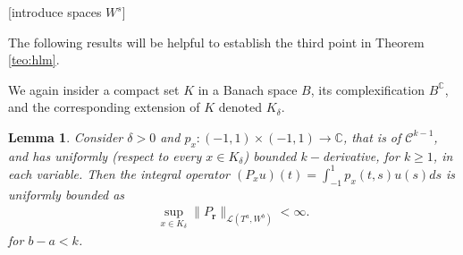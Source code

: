 \documentclass{article}
\newtheorem{lemma}[theorem]{Lemma}
\newcommand{\todo}[1]{{\color{red}[#1]}}
\newcommand{\IC}{{\mathbb C}}
\begin{document}
\todo{introduce spaces $W^s$}

The following results will be helpful to establish the third point in Theorem \ref{teo:hlm}. 

We again insider a compact set $K$ in a Banach space $B$, its complexification $B^\IC$, and the corresponding extension of $K$ denoted $K_\delta$. 

\begin{lemma}
\label{lemma:smoothops}
Consider $\delta >0$ and $p_x :(-1,1) \times (-1,1) \rightarrow \IC$, that is of $\mathcal{C}^{k-1}$, and has uniformly (respect to every $x \in K_\delta$) bounded $k-$derivative, for $k \geq 1$, in each variable. Then the integral operator $(P_x u)(t) = \int_{-1}^1 p_x(t,s) u(s) ds$ is uniformly bounded as 
\begin{align*}
\sup_{x \in K_\delta} \| P_\mathbf{r} \|_{\mathcal{L}(T^{a},W^{b})} < \infty.
\end{align*}
for $b-a < k$.
\end{lemma} 
\end{document}
